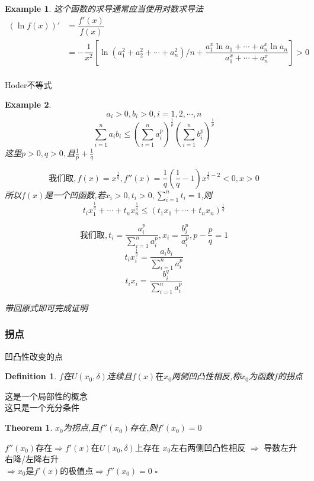 \documentclass[11pt,hyperref,a4paper,UTF8]{ctexart}
\newtheorem{theorem}{Theorem}[subsection]
\newtheorem{example}{Example}[subsection]
\newtheorem{definition}{Definition}[subsection]
\newenvironment{cproof}{%
\heiti{证明}\kaishu
}{%
  \hfill $\square$
  \par\bigskip
}
\begin{document}
\begin{CJK}{UTF8}{gkai}
\begin{example}
这个函数的求导通常应当使用对数求导法\\

\[
\begin{aligned}
(\ln f(x))' &= \dfrac{f'(x)}{f(x)}\\
&= -\dfrac{1}{x^2}[\ln(a_1^2 + a_2^2 + \cdots + a_n^2)/n + \dfrac{a_1^x \ln  a_1+ \cdots + a_n^x \ln a_n}{a_1^x + \cdots + a_n^x}] > 0\\
\end{aligned}
\]
\end{example}
Hoder不等式\\
\begin{example}
  \[a_i > 0, b_i > 0, i = 1, 2, \cdots, n\]
  \[\sum_{i = 1}^n a_i b_i \leq (\sum_{i= 1}^n a_i^p)^\frac{1}{p}(\sum_{i= 1}^n b_i^p)^\frac{1}{p}\]
  这里$p > 0 ,q > 0 ,$且$\frac{1}{p}+\frac{1}{q}$

  \[\text{我们取},f(x) = x^{\frac{1}{q}},f''(x) = \frac{1}{q}(\frac{1}{q}-1)x^{\frac{1}{q} - 2} < 0 ,x>0\]
  所以$f(x)$是一个凹函数,若$x_i > 0 ,t_i  > 0 ,\sum_{i = 1}^n t_i = 1$,则
  \[t_i x_1^{\frac{1}{q}} + \cdots + t_n x_n^{\frac{1}{q}}  \leq  (t_1 x_1 + \cdots + t_n x_n )^{\frac{1}{q}}\]

  \[\text{我们取},t_i = \dfrac{a_i^p}{\sum_{i=1}^n a_i^p} ,x_i = \dfrac{b_i^p}{a_i^p} , p - \frac{p}{q} = 1\]
  \[t_i x_i^\frac{1}{q} = {\dfrac{a_i b_i}{\sum_{i = 1}^n a_i^p}}\]
  \[t_i x_i = \dfrac{b_i^q}{\sum_{i = 1}^n a_i^p}\]

  带回原式即可完成证明


\end{example}

\subsubsection{拐点}
凹凸性改变的点

\begin{definition}
$f$在$U(x_0,\delta)$连续且$f(x)在x_0$两侧凹凸性相反,称$x_0$为函数$f$的拐点
\end{definition}
这是一个局部性的概念\\

这只是一个充分条件\\
\begin{theorem}
$x_0$为拐点,且$f''(x_0)$存在,则$f'(x_0) = 0$
\end{theorem}
\begin{cproof}
$f''(x_0)$存在$\Rightarrow f'(x)$在$U(x_0,\delta)$上存在
$x_0$左右两侧凹凸性相反 $\Rightarrow$ 导数左升右降/左降右升\\
$\Rightarrow x_0是f'(x)$的极值点$\Rightarrow f''(x_0) = 0$
\end{cproof}


\end{CJK}
\end{document}
